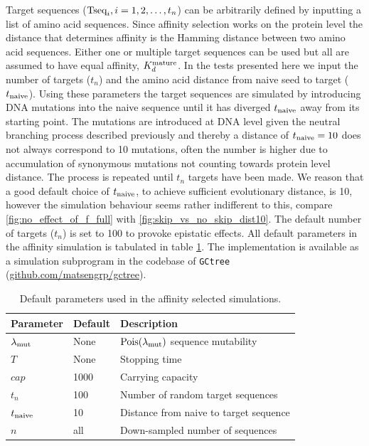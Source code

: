 Target sequences ($\text{Tseq}_i, i=1,2, \hdots, t_n$) can be arbitrarily defined by inputting a list of amino acid sequences.
Since affinity selection works on the protein level the distance that determines affinity is the Hamming distance between two amino acid sequences.
Either one or multiple target sequences can be used but all are assumed to have equal affinity, $K^{\text{mature}}_d$.
In the tests presented here we input the number of targets ($t_n$) and the amino acid distance from naive seed to target ($t_{\text{naive}}$).
Using these parameters the target sequences are simulated by introducing DNA mutations into the naive sequence until it has diverged $t_{\text{naive}}$ away from its starting point.
The mutations are introduced at DNA level given the neutral branching process described previously and thereby a distance of $t_{\text{naive}}=10$ does not always correspond to 10 mutations, often the number is higher due to accumulation of synonymous mutations not counting towards protein level distance.
The process is repeated until $t_n$ targets have been made.
We reason that a good default choice of $t_{\text{naive}}$, to achieve sufficient evolutionary distance, is 10, however the simulation behaviour seems rather indifferent to this, compare \ref{fig:no_effect_of_f_full} with \ref{fig:skip_vs_no_skip_dist10}.
The default number of targets ($t_n$) is set to 100 to provoke epistatic effects.
All default parameters in the affinity simulation is tabulated in table \ref{aff_constants}.
The implementation is available as a simulation subprogram in the codebase of \texttt{GCtree} (\url{github.com/matsengrp/gctree}).

\begin{table}[ht]
\centering
\begin{tabular}{lll}
Parameter    & Default & Description \\ \hline
$\lambda_{\text{mut}}$ & None & $\operatorname{Pois}(\lambda_{\text{mut}})$ sequence mutability \\
$T$ & None & Stopping time \\
$cap$ & 1000 & Carrying capacity \\
$t_n$ & 100 & Number of random target sequences \\
$t_{\text{naive}}$ & 10 & Distance from naive to target sequence \\
$n$ & all & Down-sampled number of sequences
\end{tabular}
\caption{
\label{aff_constants}
    Default parameters used in the affinity selected simulations.}
\end{table}










